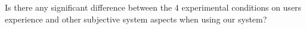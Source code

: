 \begin{theorem}
	Is there any significant difference between the 4 experimental conditions on users experience and other subjective system aspects when using our system?
\end{theorem}

%
%
%

